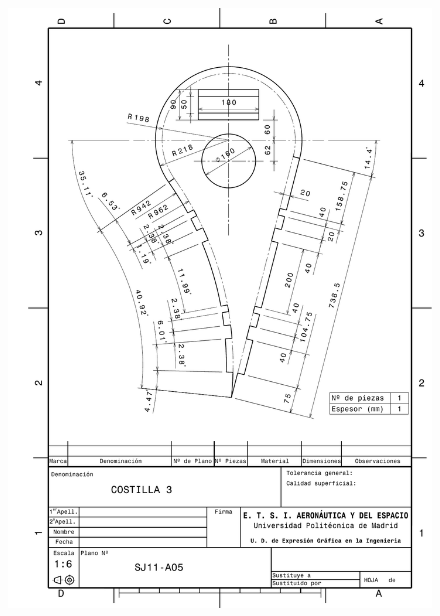 \begin{figure}
    \centering
    \includegraphics[width=\linewidth]{Figures//Planos/C3.pdf}
\end{figure}

